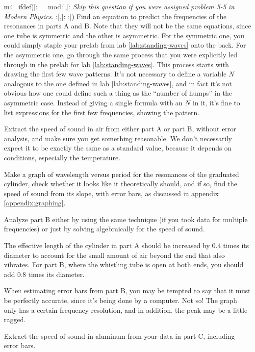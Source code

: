 \prelab

\prelabquestion
m4_ifdef([:__mod:],[:%
\emph{Skip this question if you were assigned problem 5-5 in \emph{Modern Physics}.}   
:],[:%
:])%
   Find an equation to predict the frequencies of the
resonances in parts A and B. Note that they will not be
the same equations, since one tube is symmetric and the
other is asymmetric. For the symmetric one, you could simply staple your prelab from 
lab \ref{lab:standing-waves} onto the back. For the asymmetric one, go through the same
process that you were explicitly led through in the prelab for lab \ref{lab:standing-waves}.
This process starts with drawing the first few wave patterns. It's not necessary to define a
variable $N$ analogous to the one defined in lab \ref{lab:standing-waves}, and in fact it's
not obvious how one could define such a thing as the ``number of humps'' in the asymmetric case.
Instead of giving a single formula with an $N$ in it, it's fine to list expressions for the
first few frequencies, showing the pattern.

\selfcheck

Extract the speed of sound in air from either part A or part B,
without error analysis, and make sure you get something
reasonable. We don't necessarily expect it to be exactly the same as
a standard value, because it depends on conditions, especially the temperature.

\analysis

Make a graph of wavelength versus period for the resonances
of the graduated cylinder, check whether it looks like it
theoretically should, and if so, find the speed of sound
from its slope, with error bars, as discussed in appendix
\ref{appendix:graphing}.

Analyze part B either by using the same technique (if you
took data for multiple frequencies) or just by solving algebraically for
the speed of sound.

The effective length of the cylinder in part A should be
increased by 0.4 times its diameter to account for the small
amount of air beyond the end that also vibrates.  For part
B, where the whistling tube is open at both ends, you
should add 0.8 times its diameter.

When estimating error bars from part B, you may be tempted
to say that it must be perfectly accurate, since it's being
done by a computer.  Not so!  The graph only has a certain frequency
resolution, and in addition, the peak may be
a little ragged.

Extract the speed of sound in aluminum from your data in
part C, including error bars.

